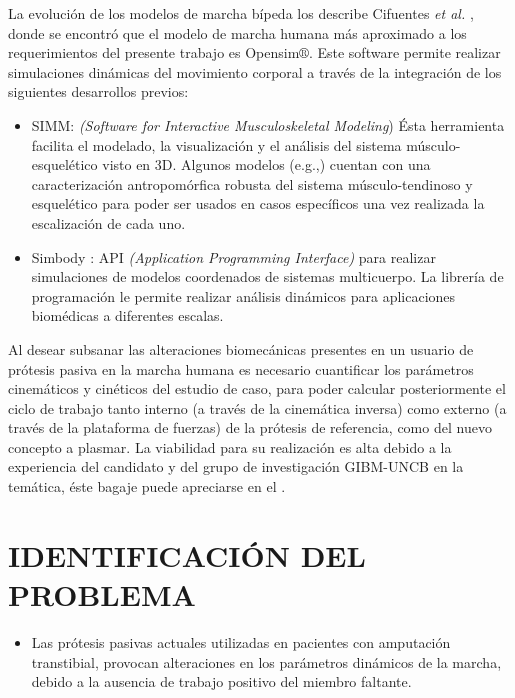 \documentclass[12pt,english]{article}
\begin{document}
La evolución de los modelos de marcha bípeda los describe Cifuentes
\emph{et al.} \cite{Cifuentes2010}, donde se encontró que el modelo
de marcha humana más aproximado a los requerimientos del presente
trabajo es Opensim$\circledR$\cite{Delp2007,Reinbolt2011,Seth2011}.
Este software permite realizar simulaciones dinámicas del movimiento
corporal a través de la integración de los siguientes desarrollos
previos: 
\begin{itemize}
\item SIMM: \emph{(Software for Interactive Musculoskeletal Modeling}) Ésta
herramienta facilita el modelado, la visualización y el análisis
del sistema músculo-esquelético visto en 3D. Algunos modelos (e.g.,\cite{Arnold2010})
cuentan con una caracterización antropomórfica robusta del sistema
músculo-tendinoso y esquelético para poder ser usados en casos específicos
una vez realizada la escalización de cada uno.
\item Simbody \cite{Sherman2011}: API \emph{(Application Programming Interface)}
para realizar simulaciones de modelos coordenados de sistemas multicuerpo.
La librería de programación le permite realizar análisis dinámicos
para aplicaciones biomédicas a diferentes escalas.
\end{itemize}
Al desear subsanar las alteraciones biomecánicas presentes en un usuario
de prótesis pasiva en la marcha humana es necesario cuantificar los
parámetros cinemáticos y cinéticos del estudio de caso, para poder
calcular posteriormente el ciclo de trabajo tanto interno (a través
de la cinemática inversa) como externo (a través de la plataforma
de fuerzas) de la prótesis de referencia, como del nuevo concepto
a plasmar. La viabilidad para su realización es alta debido a la experiencia del candidato y del grupo de investigación GIBM-UNCB en la temática, éste bagaje puede apreciarse en el .




\section*{IDENTIFICACIÓN DEL PROBLEMA}
\begin{itemize}
\item Las prótesis pasivas actuales utilizadas en pacientes con amputación transtibial, provocan alteraciones en los parámetros dinámicos de la marcha, debido a la ausencia de trabajo positivo del miembro faltante.
\end{itemize}
\end{document}
